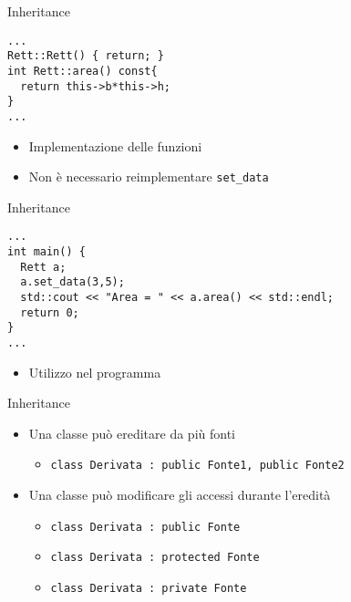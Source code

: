 \begin{frame}[fragile]{Inheritance}
  \vfill
  \begin{lstlisting}[firstnumber=19]
...
Rett::Rett() { return; }
int Rett::area() const{
  return this->b*this->h;
}
...\end{lstlisting}
  \vfill
  \begin{itemize}
    \item Implementazione delle funzioni
    \vfill
    \item Non è necessario reimplementare \lstinline$set_data$
  \end{itemize}
  \vfill
\end{frame}

\begin{frame}[fragile]{Inheritance}
  \vfill
  \begin{lstlisting}[firstnumber=23]
...
int main() {
  Rett a;
  a.set_data(3,5);
  std::cout << "Area = " << a.area() << std::endl;
  return 0;
}
...\end{lstlisting}
  \vfill
  \begin{itemize}
    \item Utilizzo nel programma
  \end{itemize}
  \vfill
\end{frame}

\begin{frame}[fragile]{Inheritance}
  \vfill
  \begin{itemize}
    \item Una classe può ereditare da più fonti
    \begin{itemize}
      \item \lstinline$class Derivata : public Fonte1, public Fonte2$
    \end{itemize}
    \vfill
    \item Una classe può modificare gli accessi durante l'eredità
    \begin{itemize}
      \item \lstinline$class Derivata : public Fonte$
      \item \lstinline$class Derivata : protected Fonte$
      \item \lstinline$class Derivata : private Fonte$
    \end{itemize}
  \end{itemize}
  \vfill
\end{frame}
